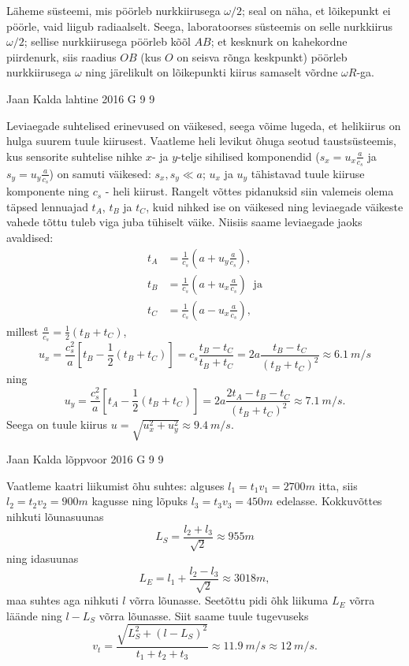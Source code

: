 \documentclass[11pt, twoside]{article}
\begin{document}
{{\ifSolution
Läheme süsteemi, mis pöörleb nurkkiirusega $\omega/2$; seal on näha, et lõikepunkt ei pöörle, vaid liigub radiaalselt.
Seega, laboratoorses süsteemis on selle nurkkiirus $\omega/2$; sellise nurkkiirusega pöörleb kõõl $AB$; et kesknurk on kahekordne piirdenurk, siis 
raadius $OB$ (kus $O$ on seisva rõnga keskpunkt) pöörleb nurkkiirusega $\omega$ ning järelikult on lõikepunkti kiirus samaselt võrdne $\omega R$-ga.
\fi
}

{Jaan Kalda} %
{lahtine} %
{2016} %
{G 9} %
{9} %
{

\ifSolution
Leviaegade suhtelised erinevused on väikesed, seega võime lugeda, et helikiirus on hulga suurem tuule kiirusest.
Vaatleme heli levikut õhuga seotud taustsüsteemis, kus sensorite suhtelise nihke $x$- ja $y$-telje sihilised komponendid ($s_x=u_x\frac a{c_s}$ ja 
$s_y=u_y\frac a{c_s}$) on samuti väikesed: $s_x, s_y\ll a$; $u_x$ ja $u_y$ tähistavad tuule kiiruse komponente ning $c_s$ - heli kiirust.
Rangelt võttes pidanuksid siin valemeis olema täpsed lennuajad $t_A$, $t_B$ ja $t_C$, kuid nihked ise on väikesed ning leviaegade 
väikeste vahede tõttu tuleb viga juba tühiselt väike. Niisiis saame leviaegade jaoks avaldised:
\begin{align*}
t_A&=\frac 1{c_s}\left(a+u_y\frac a{c_s}\right),\\
t_B&=\frac 1{c_s}\left(a+u_x\frac a{c_s}\right)\;\; \mbox{ja}\\
t_C&=\frac 1{c_s}\left(a-u_x\frac a{c_s}\right),
\end{align*}
millest $ \frac a{c_s}=\frac 12(t_B+t_C)$, $$u_x=\frac {c_s^2}a\left[t_B-\frac 12(t_B+t_C)\right]=c_s\frac{t_B-t_C}{t_B+t_C}=2a\frac{t_B-t_C}{(t_B+t_C)^2}\approx \SI{6.1}{m/s}$$
ning 
$$u_y=\frac {c_s^2}a\left[t_A-\frac 12(t_B+t_C)\right]=2a\frac{2t_A-t_B-t_C}{(t_B+t_C)^2}\approx \SI{7.1}{m/s}.$$
Seega on tuule kiirus $u=\sqrt{u_x^2+u_y^2}\approx \SI{9.4}{m/s}$.
\fi
}

{Jaan Kalda} %
{lõppvoor} %
{2016} %
{G 9} %
{9} %
{

\ifSolution
Vaatleme kaatri liikumist õhu suhtes: alguses $l_1=t_1v_1=\SI{2700}m$ itta, siis $l_2=t_2v_2=\SI{900}m$ kagusse
ning lõpuks $l_3=t_3v_3=\SI{450}m$ edelasse. Kokkuvõttes nihkuti lõunasuunas 
\[
L_S=\frac{l_2+l_3}{\sqrt 2}\approx \SI{955}m
\]
ning idasuunas
\[
L_E=l_1+\frac{l_2-l_3}{\sqrt 2}\approx \SI{3018}m,
\]
maa suhtes aga nihkuti $l$ võrra lõunasse. Seetõttu pidi õhk liikuma $L_E$ võrra läände ning $l-L_S$ võrra lõunasse. Siit saame tuule tugevuseks 
$$v_t=\frac{\sqrt{L_S^2+(l-L_S)^2}}{t_1+t_2+t_3}\approx \SI{11.9}{m/s}\approx \SI{12}{m/s}.$$ 
\fi
}

}
\end{document}
